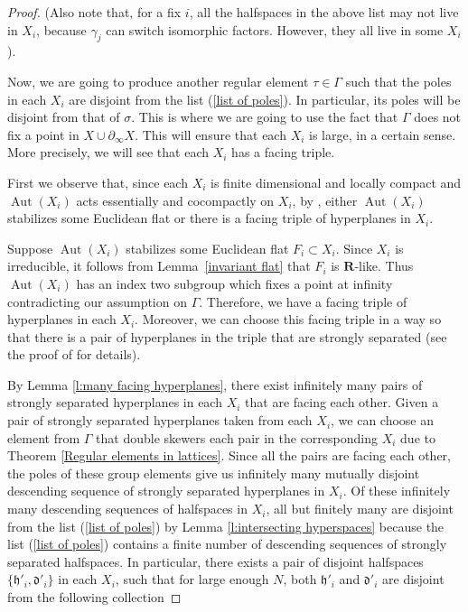 \documentclass{amsart}
\theoremstyle{definition}
\newtheorem*{Notation warning}{Warning on notations}
\newtheorem*{Sketch of proof}{Sketch of proof for Theorem C}
\newcommand{\gs}{\sigma }
\newcommand{\bdry}{\partial_\infty}
\newcommand{\h}{{\mathfrak h}}
\def\aut{\mathop{\mathrm{Aut}}\nolimits}
\begin{document}
\begin{sloppypar}
\begin{proof}
        (Also note that, for a fix $i$, all the halfspaces in the above list may not live in $X_i$, because $\gamma_j$ can switch isomorphic factors. However, they all live in some $X_i$). 
    \medskip
    
    Now, we are going to produce another regular element $\tau\in \Gamma$ such that the poles in each $X_i$ are disjoint from the list (\ref{list of poles}). In particular, its poles will be disjoint from that of $\gs$.
    This is where we are going to use the fact that $\Gamma$ does not fix a point in $X\cup\bdry X$.
    This will ensure that each $X_i$ is large, in a certain sense. More precisely, we will see that each $X_i$ has a facing triple.
    
    First we observe that, since each $X_i$ is finite dimensional and locally compact and $\aut(X_i)$ acts essentially and cocompactly on $X_i$, by \cite[Theorem 7.2]{Caprace_2011}, either $\aut(X_i)$ stabilizes some Euclidean flat or there is a facing triple of hyperplanes in $X_i$. 
    
     
     Suppose $\aut(X_i)$ stabilizes some Euclidean flat $F_i\subset X_i$. 
     Since $X_i$ is irreducible, it follows from Lemma~\ref{invariant flat} that $F_i$ is $\textbf{R}$-like.
     Thus $\aut(X_i)$ has an index two subgroup which fixes a point at infinity contradicting our assumption on $\Gamma$.
     Therefore, we have a facing triple of hyperplanes in each $X_i$.
    Moreover, we can choose this facing triple in a way so that there is a pair of hyperplanes in the triple that are strongly separated (see the proof of \cite[Theorem 7.2]{Caprace_2011} for details).
    
    
    By Lemma \ref{l:many facing hyperplanes}, there exist infinitely many pairs of strongly separated hyperplanes in each $X_i$ that are facing each other.
    Given a pair of strongly separated hyperplanes taken from each $X_i$, we can choose an element from $\Gamma$ that double skewers each pair in the corresponding $X_i$ due to Theorem \ref{Regular elements in lattices}.
    Since all the pairs are facing each other, the poles of these group elements give us infinitely many mutually disjoint descending sequence of strongly separated hyperplanes in $X_i$. 
Of these infinitely many descending sequences of halfspaces in $X_i$, all but finitely many are disjoint from the list (\ref{list of poles})  by Lemma \ref{l:intersecting hyperspaces} because the list (\ref{list of poles}) contains a finite number of descending sequences of strongly separated halfspaces.
In particular, there exists a pair of disjoint halfspaces $\{\h'_i,\mathfrak{d}'_i\}$ in each $X_i$, such that for large enough $N$, both $\h'_i$ and $\mathfrak{d}'_i$ are disjoint from the following collection 


\end{proof}
\end{sloppypar}
\end{document}
